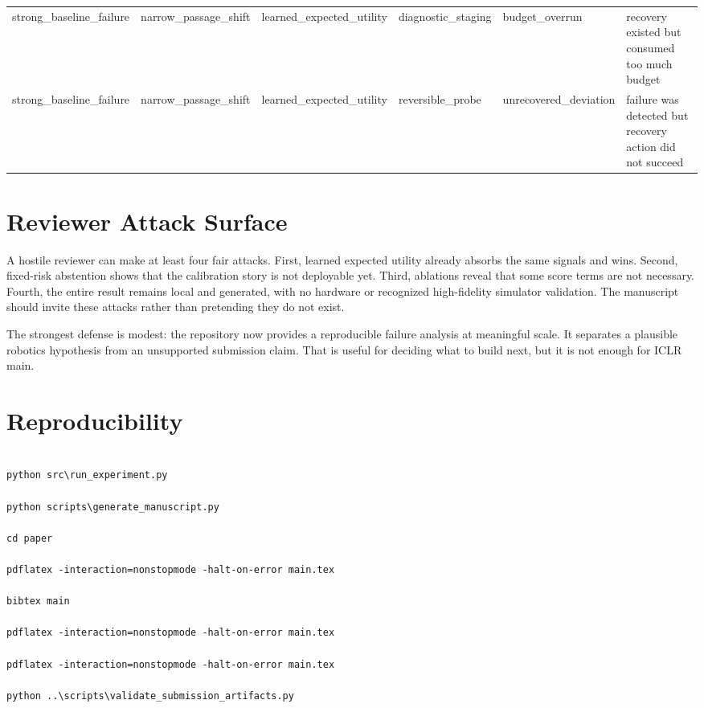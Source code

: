 \documentclass{article}
\begin{document}
\begin{center}
\begin{longtable}{p{0.15\linewidth}p{0.16\linewidth}p{0.18\linewidth}p{0.13\linewidth}p{0.15\linewidth}p{0.23\linewidth}}
strong\_baseline\_failure & narrow\_passage\_shift & learned\_expected\_utility & diagnostic\_staging & budget\_overrun & recovery existed but consumed too much budget\\
strong\_baseline\_failure & narrow\_passage\_shift & learned\_expected\_utility & reversible\_probe & unrecovered\_deviation & failure was detected but recovery action did not succeed\\
\bottomrule
\end{longtable}
\normalsize
\end{center}

\section{Reviewer Attack Surface}

A hostile reviewer can make at least four fair attacks. First, learned expected utility already absorbs the same signals and wins. Second, fixed-risk abstention shows that the calibration story is not deployable yet. Third, ablations reveal that some score terms are not necessary. Fourth, the entire result remains local and generated, with no hardware or recognized high-fidelity simulator validation. The manuscript should invite these attacks rather than pretending they do not exist.

The strongest defense is modest: the repository now provides a reproducible failure analysis at meaningful scale. It separates a plausible robotics hypothesis from an unsupported submission claim. That is useful for deciding what to build next, but it is not enough for ICLR main.

\section{Reproducibility}

\begin{verbatim}

python src\run_experiment.py

python scripts\generate_manuscript.py

cd paper

pdflatex -interaction=nonstopmode -halt-on-error main.tex

bibtex main

pdflatex -interaction=nonstopmode -halt-on-error main.tex

pdflatex -interaction=nonstopmode -halt-on-error main.tex

python ..\scripts\validate_submission_artifacts.py

\end{verbatim}
\end{document}
